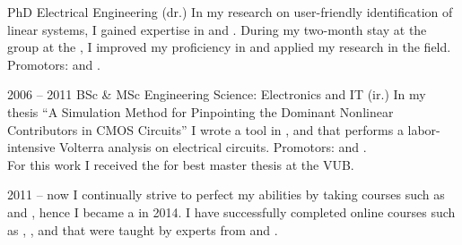 \documentclass{cv-egeerardyn}
\begin{document}
\maketitle

\begin{education}
  {PhD Electrical Engineering (dr.)}%
  {\VUB}%
  {In my research on user-friendly identification of linear systems, I gained expertise in  and . During my two-month stay at the \CST{} group at the \TUe, I improved my proficiency in  and applied my research in the field.
  Promotors: \JohanSchoukens{} and \TomOomen.}

  \addEducation%
  {2006 -- 2011}%
  {BSc \& MSc Engineering Science: Electronics  and IT (ir.)}%
  {\VUB}%
  {In my thesis ``A Simulation Method for Pinpointing the Dominant Nonlinear Contributors in CMOS Circuits'' I wrote a tool in ,  and  that performs a labor-intensive Volterra analysis on electrical circuits. 
  Promotors: \PietWambacq{} and \GerdVandersteen.\\
  For this work I received the  for best master thesis at the VUB.}

  \addText%
  {\vspace{-5.35\baselineskip}2011 -- now}%
  {I continually strive to perfect my abilities by taking courses such as  and , hence I became a  in 2014. 
  I have successfully completed online courses such as 
     , 
     , 
      and 
  that were taught by experts from \Stanford{} and \EPFL{}.}
\end{education}
\end{document}
